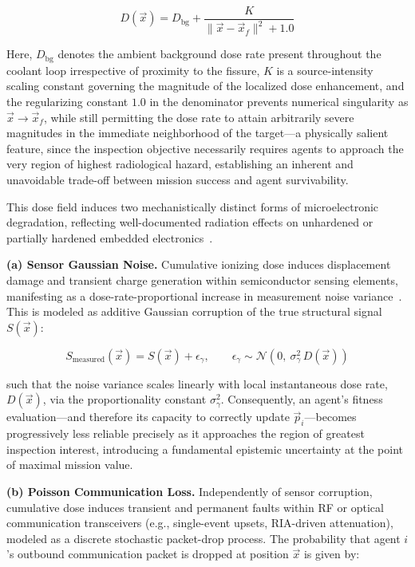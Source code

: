 \documentclass[journal]{IEEEtran}
\begin{document}
\begin{equation}
D(\vec{x}) = D_{\text{bg}} + \frac{K}{\|\vec{x} - \vec{x}_f\|^2 + 1.0}
\end{equation}

Here, $D_{\text{bg}}$ denotes the ambient background dose rate present throughout the coolant loop irrespective of proximity to the fissure, $K$ is a source-intensity scaling constant governing the magnitude of the localized dose enhancement, and the regularizing constant $1.0$ in the denominator prevents numerical singularity as $\vec{x} \to \vec{x}_f$, while still permitting the dose rate to attain arbitrarily severe magnitudes in the immediate neighborhood of the target---a physically salient feature, since the inspection objective necessarily requires agents to approach the very region of highest radiological hazard, establishing an inherent and unavoidable trade-off between mission success and agent survivability.

This dose field induces two mechanistically distinct forms of microelectronic degradation, reflecting well-documented radiation effects on unhardened or partially hardened embedded electronics~\cite{radiation_mos}.

\textbf{(a) Sensor Gaussian Noise.} Cumulative ionizing dose induces displacement damage and transient charge generation within semiconductor sensing elements, manifesting as a dose-rate-proportional increase in measurement noise variance~\cite{sensor_degradation}. This is modeled as additive Gaussian corruption of the true structural signal $S(\vec{x})$:

\begin{equation}
S_{\text{measured}}(\vec{x}) = S(\vec{x}) + \epsilon_{\gamma}, \qquad \epsilon_{\gamma} \sim \mathcal{N}\left(0,\ \sigma_\gamma^2\, D(\vec{x})\right)
\end{equation}

such that the noise variance scales linearly with local instantaneous dose rate, $D(\vec{x})$, via the proportionality constant $\sigma_\gamma^2$. Consequently, an agent's fitness evaluation---and therefore its capacity to correctly update $\vec{p}_i$---becomes progressively less reliable precisely as it approaches the region of greatest inspection interest, introducing a fundamental epistemic uncertainty at the point of maximal mission value.

\textbf{(b) Poisson Communication Loss.} Independently of sensor corruption, cumulative dose induces transient and permanent faults within RF or optical communication transceivers (e.g., single-event upsets, RIA-driven attenuation), modeled as a discrete stochastic packet-drop process. The probability that agent $i$'s outbound communication packet is dropped at position $\vec{x}$ is given by:
\end{document}
